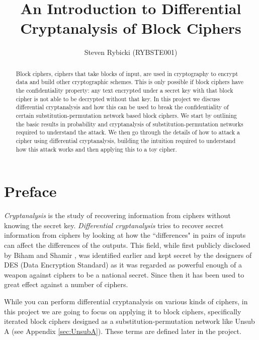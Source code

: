 \documentclass[12pt,a4paper]{article}
\title{An Introduction to Differential Cryptanalysis of Block Ciphers}
\author{Steven Rybicki (RYBSTE001)}
\date{}
\begin{document}
\maketitle
\begin{abstract}
Block ciphers, ciphers that take blocks of input, are used in cryptography to
encrypt data and build other cryptographic schemes. This is only possible if
block ciphers have the confidentiality property: any text encrypted under a
secret key with that block cipher is not able to be decrypted without that key.
In this project we discuss differential cryptanalysis and how this can be used
to break the confidentiality of certain substitution-permutation network based
block ciphers. We start by outlining the basic results in probability and
cryptanalysis of substitution-permutation networks required to understand the
attack. We then go through the details of how to attack a cipher using
differential cryptanalysis, building the intuition required to understand how
this attack works and then applying this to a toy cipher. 
\end{abstract}
\newpage
\tableofcontents
\listoffigures
\listoftables
\newpage
\section{Preface}
\textit{Cryptanalysis} is the study of recovering information from ciphers
without knowing the secret key. \textit{Differential cryptanalysis} tries to
recover secret information from ciphers by looking at how the ``differences" in
pairs of inputs can affect the differences of the outputs. This field, while
first publicly disclosed by Biham and Shamir \cite{biham1991differential}, was
identified earlier and kept secret by the designers of DES (Data Encryption
Standard) as it was regarded as powerful enough of a weapon against ciphers to
be a national secret. Since then it has been used to great effect against a
number of ciphers.

While you can perform differential cryptanalysis on various kinds of ciphers,
in this project we are going to focus on applying it to block ciphers,
specifically iterated block ciphers designed as a substitution-permutation
network like Unsub A (see Appendix \ref{sec:UnsubA}). These terms are defined
later in the project.
\end{document}
